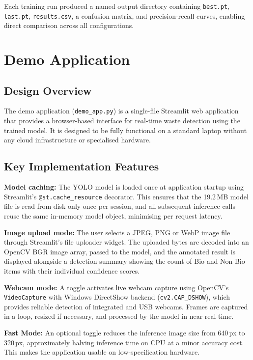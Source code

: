 Each training run produced a named output directory containing \texttt{best.pt}, \texttt{last.pt}, \texttt{results.csv}, a confusion matrix, and precision-recall curves, enabling direct comparison across all configurations.

\section{Demo Application}

\subsection{Design Overview}

The demo application (\texttt{demo\_app.py}) is a single-file Streamlit web application that provides a browser-based interface for real-time waste detection using the trained model. It is designed to be fully functional on a standard laptop without any cloud infrastructure or specialised hardware.

\subsection{Key Implementation Features}

\textbf{Model caching:} The YOLO model is loaded once at application startup using Streamlit's \texttt{@st.cache\_resource} decorator. This ensures that the 19.2\,MB model file is read from disk only once per session, and all subsequent inference calls reuse the same in-memory model object, minimising per request latency.

\textbf{Image upload mode:} The user selects a JPEG, PNG or WebP image file through Streamlit's file uploader widget. The uploaded bytes are decoded into an OpenCV BGR image array, passed to the model, and the annotated result is displayed alongside a detection summary showing the count of Bio and Non-Bio items with their individual confidence scores.

\textbf{Webcam mode:} A toggle activates live webcam capture using OpenCV's \texttt{VideoCapture} with Windows DirectShow backend (\texttt{cv2.CAP\_DSHOW}), which provides reliable detection of integrated and USB webcams. Frames are captured in a loop, resized if necessary, and processed by the model in near real-time.

\textbf{Fast Mode:} An optional toggle reduces the inference image size from 640\,px to 320\,px, approximately halving inference time on CPU at a minor accuracy cost. This makes the application usable on low-specification hardware.

